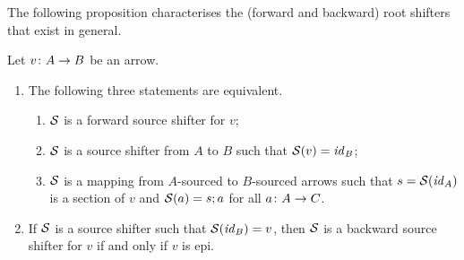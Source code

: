 The following proposition characterises the (forward and backward) root shifters that exist in general.
%
\begin{proposition}
Let $v\colon A\rightarrow B$ be an arrow.
\begin{enumerate}[topsep=\smallskipamount]
\item The following three statements are equivalent.
\begin{enumerate}[label=(\alph*),ref=\theenumi(\theenumii)]
\item\label{forward-1} $\mathcal{S}$ is a forward source shifter for $v$;
\item\label{forward-2} $\mathcal{S}$ is a source shifter from $A$ to $B$ such that $\mathcal{S}(v)=\mathit{id}_B$;
\item\label{forward-3} $\mathcal{S}$ is a mapping from $A$-sourced to $B$-sourced arrows such that $s=\mathcal{S}(\mathit{id}_A)$ is a section of $v$ and $\mathcal{S}(a)=s;a$ for all $a\colon A\rightarrow C$.
\end{enumerate}
\item If $\mathcal{S}$ is a source shifter such that $\mathcal{S}(\mathit{id}_B)=v$, then $\mathcal{S}$ is a backward source shifter for $v$ if and only if $v$ is epi.
\end{enumerate}
\end{proposition}
%
